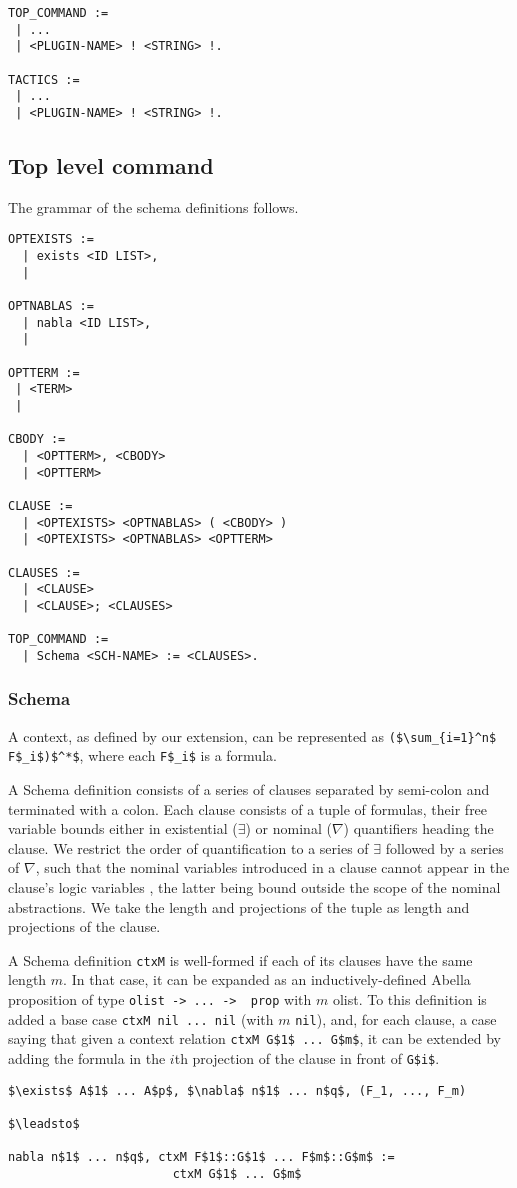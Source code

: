 \documentclass[nocopyrightspace,authoryear]{sigplanconf}
\begin{document}
\begin{lstlisting}
TOP_COMMAND :=
 | ...
 | <PLUGIN-NAME> ! <STRING> !.

TACTICS :=
 | ...
 | <PLUGIN-NAME> ! <STRING> !.
\end{lstlisting}



\subsection{Top level command}
The grammar of the schema definitions follows.

\begin{lstlisting}
OPTEXISTS :=
  | exists <ID LIST>, 
  |

OPTNABLAS :=
  | nabla <ID LIST>,
  |

OPTTERM :=
 | <TERM>
 | 

CBODY :=
  | <OPTTERM>, <CBODY>
  | <OPTTERM>

CLAUSE :=
  | <OPTEXISTS> <OPTNABLAS> ( <CBODY> )
  | <OPTEXISTS> <OPTNABLAS> <OPTTERM>

CLAUSES :=
  | <CLAUSE>
  | <CLAUSE>; <CLAUSES>

TOP_COMMAND :=
  | Schema <SCH-NAME> := <CLAUSES>.
\end{lstlisting} 

\subsubsection{Schema}
A context, as defined by our extension, can be represented as \lstinline|($\sum_{i=1}^n$ F$_i$)$^*$|, where each \lstinline|F$_i$| is a formula. 

A Schema definition consists of a series of clauses separated by semi-colon and terminated with a colon. Each clause consists of a tuple of formulas, their free variable bounds either in existential ($\exists$) or  nominal ($\nabla$) quantifiers heading the clause. We restrict the order of quantification to a series of $\exists$ followed by a series of $\nabla$, such that the nominal variables introduced in a clause cannot appear in the clause's logic variables , the latter being bound outside the scope of the nominal abstractions. We take the length and projections of the tuple as length and projections of the clause.

A Schema definition \lstinline|ctxM| is well-formed if each of its clauses have the same length $m$. In that case, it can be expanded as an inductively-defined Abella proposition of type \lstinline|olist -> ... ->  prop| with $m$ olist. To this definition is added a base case \lstinline|ctxM nil ... nil| (with $m$ \lstinline|nil|), and, for each clause, a case saying that given a context relation \lstinline|ctxM G$1$ ... G$m$|, it can be extended by adding the formula in the $i$th projection of the clause in front of \lstinline|G$i$|.
\begin{lstlisting}
$\exists$ A$1$ ... A$p$, $\nabla$ n$1$ ... n$q$, (F_1, ..., F_m)

$\leadsto$

nabla n$1$ ... n$q$, ctxM F$1$::G$1$ ... F$m$::G$m$ := 
                       ctxM G$1$ ... G$m$
\end{lstlisting}
\end{document}
